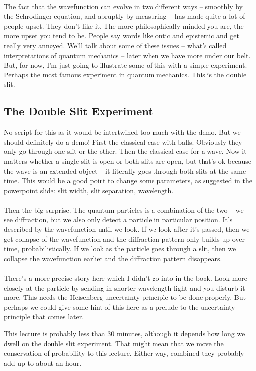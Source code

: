 \documentclass[12pt]{article}
\newcommand\para{\paragraph{}}
\begin{document}
\para
The fact that the wavefunction can evolve in two different ways -- smoothly by the Schrodinger equation, and abruptly by measuring -- has made quite a lot of people upset. They don't like it. The more philosophically minded you are, the more upset you tend to be. People say words like ontic and epistemic and get really very annoyed. We'll talk about some of these issues -- what's called interpretations of quantum mechanics -- later when we have more under our belt. But, for now, I'm just going to illustrate some of this with a simple experiment. Perhaps the most famous experiment in quantum mechanics. This is the double slit.

\subsection{The Double Slit Experiment}

{\color{blue} No script for this as it would be intertwined too much with the demo. But we should definitely do a demo! First the classical case with balls. Obviously they only go through one slit or the other. Then the classical case for a wave. Now it matters whether a single slit is open or both slits are open, but that's ok because the wave is an extended object -- it literally goes through both slits at the same time. This would be a good point to change some parameters, as suggested in the powerpoint slide: slit width, slit separation, wavelength.

\para
Then the big surprise. The quantum particles is a combination of the two -- we see diffraction, but we also only detect a particle in particular position. It's described by the wavefunction until we look. If we look after it's passed, then we get collapse of the wavefunction and the diffraction pattern only builds up over time, probabilistically. If we look as the particle goes through a slit, then we collapse the wavefunction earlier and the diffraction pattern disappears.

\para
There's a more precise story here which I didn't go into in the book. Look more closely at the particle by sending in shorter wavelength light and you disturb it more. This needs the Heisenberg uncertainty principle to be done properly. But perhaps we could give some hint of this here as a prelude to the uncertainty principle that comes later.}

{\color{red} This lecture is probably less than 30 minutes, although it depends how long we dwell on the double slit experiment.  That might mean that we move the conservation of probability to this lecture. Either way, combined they probably add up to about an hour.} 
\end{document}
